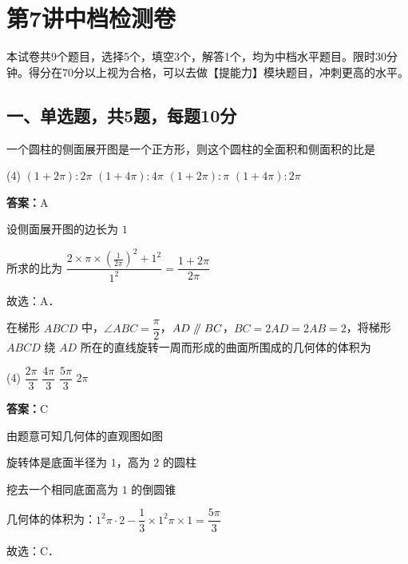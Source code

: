 \section{第7讲\quad 中档检测卷}

本试卷共9个题目，选择5个，填空3个，解答1个，均为中档水平题目。限时30分钟。得分在70分以上视为合格，可以去做【提能力】模块题目，冲刺更高的水平。

\subsection{一、单选题，共5题，每题10分}

\begin{example}[\bkstar{2}{5}]
一个圆柱的侧面展开图是一个正方形，则这个圆柱的全面积和侧面积的比是
\begin{tasks}(4)
    \task $(1+2\pi):2\pi$
    \task $(1+4\pi):4\pi$
    \task $(1+2\pi):\pi$
    \task $(1+4\pi):2\pi$
\end{tasks}
\end{example}
\begin{solution}
\textbf{答案：}A

设侧面展开图的边长为 $1$

所求的比为 $\dfrac{2\times\pi\times\left(\frac{1}{2\pi}\right)^2+1^2}{1^2}=\dfrac{1+2\pi}{2\pi}$

故选：A．
\end{solution}

\vspace{2em}

\begin{example}[\bkstar{2}{5}]
在梯形 $ABCD$ 中，$\angle ABC=\dfrac{\pi}{2}$，$AD\mathrel{/\mkern-5mu/} BC$，$BC=2AD=2AB=2$，将梯形 $ABCD$ 绕 $AD$ 所在的直线旋转一周而形成的曲面所围成的几何体的体积为
\begin{tasks}(4)
    \task $\dfrac{2\pi}{3}$
    \task $\dfrac{4\pi}{3}$
    \task $\dfrac{5\pi}{3}$
    \task $2\pi$
\end{tasks}
\end{example}
\begin{solution}
\textbf{答案：}C

由题意可知几何体的直观图如图

旋转体是底面半径为 $1$，高为 $2$ 的圆柱

挖去一个相同底面高为 $1$ 的倒圆锥

几何体的体积为：$1^2\pi\cdot 2-\dfrac{1}{3}\times 1^2\pi\times 1=\dfrac{5\pi}{3}$

故选：C．
\end{solution}

